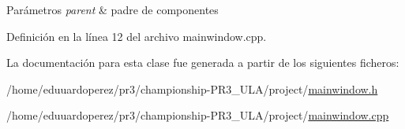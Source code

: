 \begin{DoxyParams}{Parámetros}
{\em parent} & padre de componentes \\
\hline
\end{DoxyParams}


Definición en la línea 12 del archivo mainwindow.\+cpp.



La documentación para esta clase fue generada a partir de los siguientes ficheros\+:\begin{DoxyCompactItemize}
\item 
/home/eduuardoperez/pr3/championship-\/\+P\+R3\+\_\+\+U\+L\+A/project/\hyperlink{mainwindow_8h}{mainwindow.\+h}\item 
/home/eduuardoperez/pr3/championship-\/\+P\+R3\+\_\+\+U\+L\+A/project/\hyperlink{mainwindow_8cpp}{mainwindow.\+cpp}\end{DoxyCompactItemize}
